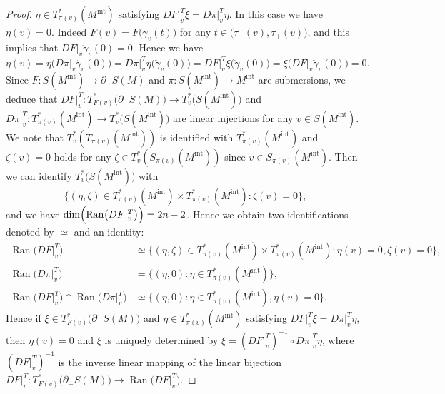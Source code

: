 \documentclass[a4paper,11pt,reqno]{amsart}
\numberwithin{equation}{section}
\theoremstyle{definition}
\theoremstyle{remark}
\begin{document}
\begin{proof}
$\eta \in T^\ast_{\pi(v)}(M^\text{int})$ 
satisfying $DF\vert^T_v\xi=D\pi\vert^T_v\eta$. 
In this case we have $\eta(v)=0$. 
Indeed $F(v)=F\bigl(\dot{\gamma}_v(t)\bigr)$ for any $t \in \bigl(\tau_-(v),\tau_+(v)\bigr)$, and this implies that 
$DF\vert_v\ddot{\gamma}_v(0)=0$. Hence we have 
%
%
\begin{equation}
\eta(v)
=
\eta\bigl(D\pi\vert_v\ddot{\gamma}_v(0)\bigr)
=
D\pi\vert^T_v\eta\bigl(\ddot{\gamma}_v(0)\bigr)
=
DF\vert^T_v\xi\bigl(\ddot{\gamma}_v(0)\bigr)
=
\xi\bigl(DF\vert_v\ddot{\gamma}_v(0)\bigr)
=
0. 
\label{equation:etav}
\end{equation}
%
%
Since $F:S(M^\text{int}) \rightarrow \partial_-S(M)$ and $\pi:S(M^\text{int}) \rightarrow M^\text{int}$ are submersions, 
we deduce that $DF\vert^T_v:T^\ast_{F(v)}\bigl( \partial_-S(M)\bigr) \rightarrow T^\ast_v\bigl(S(M^\text{int})\bigr)$ 
and $D\pi\vert^T_v:T^\ast_{\pi(v)}(M^\text{int}) \rightarrow T^\ast_v\bigl(S(M^\text{int})\bigr)$ are linear injections for any $v \in S(M^\text{int})$. 
We note that 
$T^\ast_v(T_{\pi(v)}(M^\text{int}))$ is identified with $T^\ast_{\pi(v)}(M^\text{int})$  
and $\zeta(v)=0$ holds for any $\zeta \in T^\ast_v(S_{\pi(v)}(M^\text{int}))$ 
since $v \in S_{\pi(v)}(M^\text{int})$. Then we can identify 
$T^\ast_v\bigl(S(M^\text{int})\bigr)$ with 
%
%
$$
\{(\eta,\zeta) \in T^\ast_{\pi(v)}(M^\text{int}){\times}T^\ast_{\pi(v)}(M^\text{int}): \zeta(v)=0\},
$$
%
%
and we have $\operatorname{dim}\Bigl(\operatorname{Ran}\bigl(DF\vert^T_v\bigr)\Bigr)=2n-2$. 
Hence we obtain two identifications denoted by $\simeq$ and an identity:  
%
%
\begin{align*}
  \operatorname{Ran}\bigl(DF\vert^T_v\bigr)
& \simeq
  \{(\eta,\zeta) \in T^\ast_{\pi(v)}(M^\text{int}){\times}T^\ast_{\pi(v)}(M^\text{int}): \eta(v)=0, \zeta(v)=0\},
\\
  \operatorname{Ran}\bigl(D\pi\vert^T_v\bigr)
& =
  \{(\eta,0) : \eta \in T^\ast_{\pi(v)}(M^\text{int})\},
\\
  \operatorname{Ran}\bigl(DF\vert^T_v\bigr)\cap\operatorname{Ran}\bigl(D\pi\vert^T_v\bigr)
& \simeq
  \{(\eta,0): \eta \in T^\ast_{\pi(v)}(M^\text{int}), \eta(v)=0\}. 
\end{align*}
%
%
Hence if 
$\xi \in T^\ast_{F(v)}\bigl(\partial_-S(M)\bigr)$ and  
$\eta \in T^\ast_{\pi(v)}(M^\text{int})$ 
satisfying $DF\vert^T_v\xi=D\pi\vert^T_v\eta$, then 
$\eta(v)=0$ and $\xi$ is uniquely determined by 
$\xi=(DF\vert^T_v)^{-1}{\circ}D\pi\vert^T_v\eta$, 
where $(DF\vert^T_v)^{-1}$ is the inverse linear mapping of the linear bijection 
$DF\vert^T_v:T^\ast_{F(v)}\bigl(\partial_-S(M)\bigr) \rightarrow \operatorname{Ran}\bigl(DF\vert^T_v\bigr)$. 

\end{proof}
\end{document}
